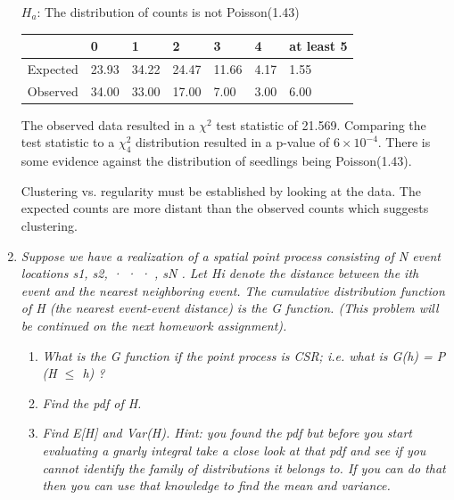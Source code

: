 \documentclass{article}\usepackage[]{graphicx}\usepackage[]{color}
\begin{document}
\begin{enumerate}
$H_{a}$: The distribution of counts is not Poisson(1.43)

\begin{table}[ht]
\centering
\begin{tabular}{||l|l|l|l|l|l|l||}
  \hline
 & 0 & 1 & 2 & 3 & 4 & at least 5 \\ 
  \hline
Expected & 23.93 & 34.22 & 24.47 & 11.66 & 4.17 & 1.55 \\ 
  Observed & 34.00 & 33.00 & 17.00 & 7.00 & 3.00 & 6.00 \\ 
   \hline
\end{tabular}
\end{table}

  
  The observed data resulted in a $\chi^{2}$ test statistic of 21.569. Comparing the test statistic to a $\chi^{2}_{4}$ distribution resulted in a p-value of \ensuremath{6\times 10^{-4}}. There is some evidence against the distribution of seedlings being Poisson(1.43).
  
  Clustering vs. regularity must be established by looking at the data. The expected counts are more distant than the observed counts which suggests clustering.
  
   \item {\it Suppose we have a realization of a spatial point process consisting of N event locations {s1, s2, · · · , sN }. Let Hi denote the distance between the ith event and the nearest neighboring event. The cumulative distribution function of H (the nearest event-event distance) is the G function. (This problem will be continued on the next homework assignment).}
  
  \begin{enumerate}
  \item {\it What is the G function if the point process is CSR; i.e. what is G(h) = P (H $\leq$ h) ?}
  
  \vspace{1in}
  
  \item {\it Find the pdf of H.}
  
  \vspace{2in}
  
  \item {\it Find E[H] and Var(H). Hint: you found the pdf but before you start evaluating a gnarly integral take a close look at that pdf and see if you cannot identify the family of distributions it belongs to. If you can do that then you can use that knowledge to find the mean and variance.}
  
\end{enumerate}
\end{enumerate}
\end{document}
